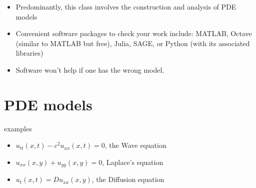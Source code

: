 \documentclass[t,10pt,fleqn]{beamer}
\begin{document}
\begin{frame}

   \begin{block}{}
  \begin{itemize}
    \pause
      \item Predominantly, this class involves the construction and  analysis of PDE models
      \pause
       \item     Convenient software packages to check your work include:  MATLAB, Octave (similar to MATLAB but free), Julia, SAGE, or  Python (with its associated libraries)
      \pause
      \item Software won't help if one has the wrong model.
      \pause
     \end{itemize}
  \end{block}
   
 \end{frame}

    
\section{PDE models}
\begin{frame}

\begin{block}{examples}
\begin{itemize}
    \pause
      \item  $u_{tt}(x,t) - c^2 u_{xx}(x,t) =0$, the Wave equation
          \pause
             \item  $u_{xx}(x,y) + u_{yy}(x,y) =0$, Laplace's equation
                  \pause
             \item  $u_{t}(x,t) = D u_{xx}(x,y)$, the Diffusion equation     
       \end{itemize}
  \end{block}
  
 \end{frame}
\end{document}
